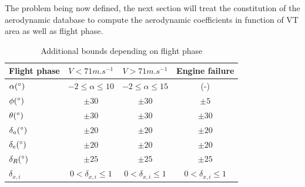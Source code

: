 The problem being now defined, the next section will treat the constitution of the aerodynamic database to compute the aerodynamic coefficients in function of VT area as well as flight phase.

\begin{table}[hbt!]
	\caption{\label{tab:Bonds} Additional bounds depending on flight phase}
	\centering
	\begin{tabular}{l|c|c|c}
		Flight phase & $V<71 m.s^{-1}$& $V>71 m.s^{-1}$ & Engine failure\\
		\hline
		$\alpha (\degree)$ & $-2\leq\alpha\leq 10$ & $-2\leq\alpha\leq 15$ & (-) \\
		$\phi (\degree)$ & $\pm 30$ & $\pm 30$ & $\pm 5$\\ 
		$\theta (\degree)$ & $\pm 30$ & $\pm 30$& $\pm 30$\\
		$\delta_a(\degree)$ & $\pm 20$& $\pm 20$& $\pm 20$\\
		$\delta_e(\degree)$ & $\pm 20$ & $\pm 20$ & $\pm 20$\\
		$\delta_R(\degree)$ & $\pm 25$ & $\pm 25$ & $\pm 25$\\
		$\delta_{x,i}$ & $0< \delta_{x,i} \leq 1$ & $0< \delta_{x,i} \leq 1$ & $0< \delta_{x,i} \leq 1$ \\
	\end{tabular}
\end{table}

